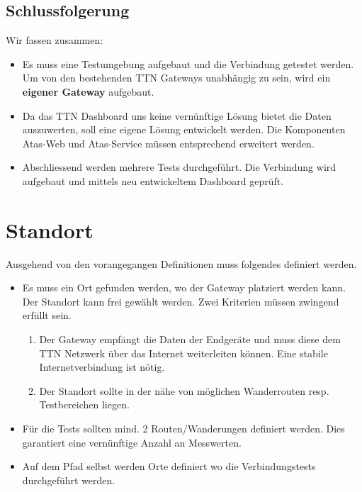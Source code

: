 \documentclass[11pt,english,german]{report}
\theoremstyle{definition}
\begin{document}
\subsection{Schlussfolgerung}
Wir fassen zusammen:
\begin{itemize}
	\item
	Es muss eine Testumgebung aufgebaut und die Verbindung getestet werden. Um von den bestehenden TTN Gateways unabhängig zu sein, wird ein \textbf{eigener Gateway} aufgebaut.
	\item 
	Da das TTN Dashboard uns keine vernünftige Lösung bietet die Daten auszuwerten, soll eine eigene Lösung entwickelt werden. Die Komponenten Atas-Web und Atas-Service müssen entsprechend erweitert werden.
	\item Abschliessend werden mehrere Tests durchgeführt. Die Verbindung wird aufgebaut und mittels neu entwickeltem Dashboard geprüft.
\end{itemize}

\newpage
\section{Standort}
Ausgehend von den vorangegangen Definitionen muss folgendes definiert werden.
\begin{itemize}
	\item Es muss ein Ort gefunden werden, wo der Gateway platziert werden kann.\\[0.3cm]
	Der Standort kann frei gewählt werden. Zwei Kriterien müssen zwingend erfüllt sein. 
	\begin{enumerate}
		\item
		Der Gateway empfängt die Daten der Endgeräte und muss diese dem TTN Netzwerk über das Internet weiterleiten können. Eine stabile Internetverbindung ist nötig. 
		\item 
		Der Standort sollte in der nähe von möglichen Wanderrouten resp. Testbereichen liegen.
	\end{enumerate}
	\item Für die Tests sollten mind. 2 Routen/Wanderungen definiert werden. Dies garantiert eine vernünftige Anzahl an Messwerten.
	\item Auf dem Pfad selbst werden Orte definiert wo die Verbindungstests durchgeführt werden.
\end{itemize}

\newpage
\end{document}
